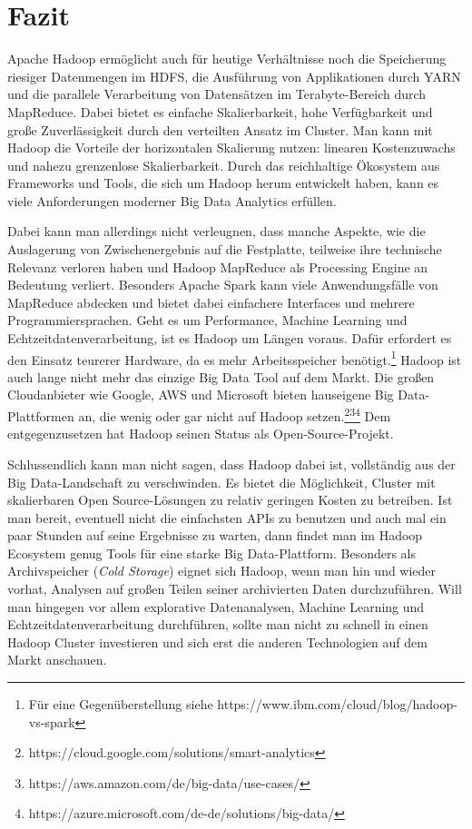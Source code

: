 \chapter{Fazit}
Apache Hadoop ermöglicht auch für heutige Verhältnisse noch die Speicherung riesiger Datenmengen im HDFS, die Ausführung von Applikationen durch YARN und die parallele Verarbeitung von Datensätzen im Terabyte-Bereich durch MapReduce. Dabei bietet es einfache Skalierbarkeit, hohe Verfügbarkeit und große Zuverlässigkeit durch den verteilten Ansatz im Cluster. Man kann mit Hadoop die Vorteile der horizontalen Skalierung nutzen: linearen Kostenzuwachs und nahezu grenzenlose Skalierbarkeit. Durch das reichhaltige Ökosystem aus Frameworks und Tools, die sich um Hadoop herum entwickelt haben, kann es viele Anforderungen moderner Big Data Analytics erfüllen.
\par
Dabei kann man allerdings nicht verleugnen, dass manche Aspekte, wie die Auslagerung von Zwischenergebnis auf die Festplatte, teilweise ihre technische Relevanz verloren haben und Hadoop MapReduce als Processing Engine an Bedeutung verliert. Besonders Apache Spark kann viele Anwendungsfälle von MapReduce abdecken und bietet dabei einfachere Interfaces und mehrere Programmiersprachen. Geht es um Performance, Machine Learning und Echtzeitdatenverarbeitung, ist es Hadoop um Längen voraus. Dafür erfordert es den Einsatz teurerer Hardware, da es mehr Arbeitsspeicher benötigt.\footnote{Für eine Gegenüberstellung siehe https://www.ibm.com/cloud/blog/hadoop-vs-spark}
Hadoop ist auch lange nicht mehr das einzige Big Data Tool auf dem Markt. Die großen Cloudanbieter wie Google, AWS und Microsoft bieten hauseigene Big Data-Plattformen an, die wenig oder gar nicht auf Hadoop setzen.\footnote{https://cloud.google.com/solutions/smart-analytics}\footnote{https://aws.amazon.com/de/big-data/use-cases/}\footnote{https://azure.microsoft.com/de-de/solutions/big-data/} Dem entgegenzusetzen hat Hadoop seinen Status als Open-Source-Projekt.
\par
Schlussendlich kann man nicht sagen, dass Hadoop dabei ist, vollständig aus der Big Data-Landschaft zu verschwinden. Es bietet die Möglichkeit, Cluster mit skalierbaren Open Source-Lösungen zu relativ geringen Kosten zu betreiben. Ist man bereit, eventuell nicht die einfachsten APIs zu benutzen und auch mal ein paar Stunden auf seine Ergebnisse zu warten, dann findet man im Hadoop Ecosystem genug Tools für eine starke Big Data-Plattform. Besonders als Archivspeicher (\textit{Cold Storage}) eignet sich Hadoop, wenn man hin und wieder vorhat, Analysen auf großen Teilen seiner archivierten Daten durchzuführen. Will man hingegen vor allem explorative Datenanalysen, Machine Learning und Echtzeitdatenverarbeitung durchführen, sollte man nicht zu schnell in einen Hadoop Cluster investieren und sich erst die anderen Technologien auf dem Markt anschauen.